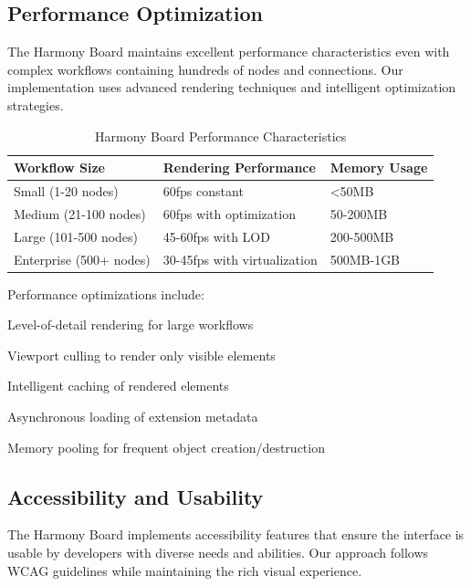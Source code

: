 \subsection*{Performance Optimization}

The Harmony Board maintains excellent performance characteristics even with complex workflows containing hundreds of nodes and connections. Our implementation uses advanced rendering techniques and intelligent optimization strategies.

\begin{table}[ht]
\centering
\begin{tabular}{@{}lll@{}}
\toprule
\textbf{Workflow Size} & \textbf{Rendering Performance} & \textbf{Memory Usage} \\
\midrule
Small (1-20 nodes) & 60fps constant & <50MB \\
Medium (21-100 nodes) & 60fps with optimization & 50-200MB \\
Large (101-500 nodes) & 45-60fps with LOD & 200-500MB \\
Enterprise (500+ nodes) & 30-45fps with virtualization & 500MB-1GB \\
\bottomrule
\end{tabular}
\caption{Harmony Board Performance Characteristics}
\end{table}

Performance optimizations include:

\begin{compactlist}
    \item Level-of-detail rendering for large workflows
    \item Viewport culling to render only visible elements
    \item Intelligent caching of rendered elements
    \item Asynchronous loading of extension metadata
    \item Memory pooling for frequent object creation/destruction
\end{compactlist}

\subsection*{Accessibility and Usability}

The Harmony Board implements accessibility features that ensure the interface is usable by developers with diverse needs and abilities. Our approach follows WCAG guidelines while maintaining the rich visual experience.

